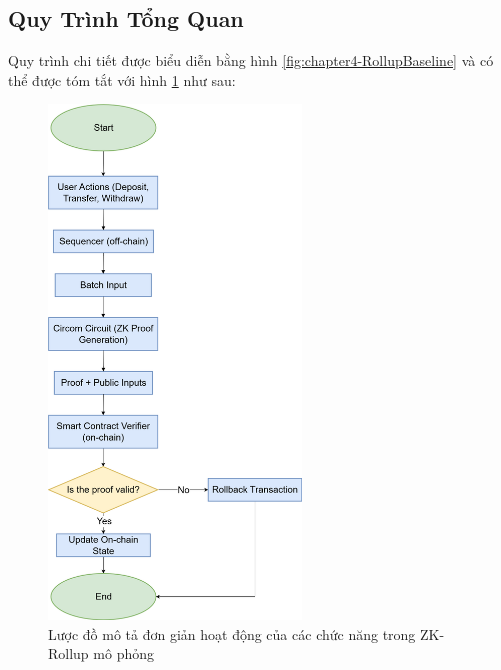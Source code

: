 \subsection{Quy Trình Tổng Quan}
Quy trình chi tiết được biểu diễn bằng hình \ref{fig:chapter4-RollupBaseline} và có thể được tóm tắt với hình \ref{fig:chapter4-SimpleRollupBaseline} như sau:

\begin{figure}[t]
    \centering
    \includegraphics[width = 0.6\textwidth]{imgs/SimpleRollupBaseline.png}
    \caption{Lược đồ mô tả đơn giản hoạt động của các chức năng trong ZK-Rollup mô phỏng}
    \label{fig:chapter4-SimpleRollupBaseline}
\end{figure}

